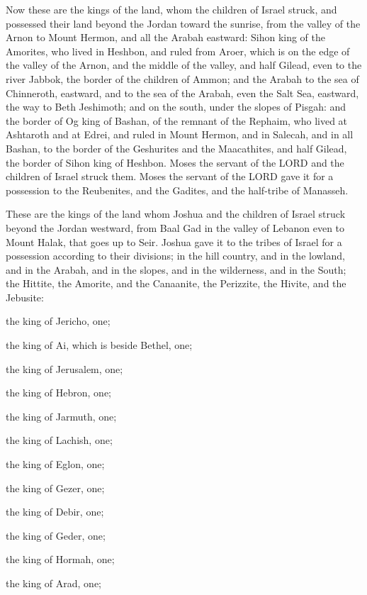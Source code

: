 \mychapter{} \myverse*{}Now these are the kings of the land, whom the children of Israel
struck, and possessed their land beyond the Jordan toward the sunrise, from the valley of the Arnon to
Mount Hermon, and all the Arabah eastward:
\myverse{}Sihon king of the Amorites, who lived in Heshbon, and ruled from Aroer, which
is on the edge of the valley of the Arnon, and the middle of the valley, and half Gilead, even to the
river Jabbok, the border of the children of Ammon;
\myverse{}and the Arabah to the sea of Chinneroth, eastward, and to the sea of the Arabah,
even the Salt Sea, eastward, the way to Beth Jeshimoth; and on the south, under the slopes of Pisgah:
\myverse{}and the border of Og king of Bashan, of the remnant of the Rephaim, who lived
at Ashtaroth and at Edrei,
\myverse{}and ruled in Mount Hermon, and in Salecah, and in all Bashan, to the border
of the Geshurites and the Maacathites, and half Gilead, the border of Sihon king of Heshbon.
\myverse{}Moses the servant of the LORD and the children of Israel struck them. Moses
the servant of the LORD gave it for a possession to the Reubenites, and the Gadites, and the half-tribe
of Manasseh.

\myverse{}These are the kings of the land whom Joshua and the children of
Israel struck beyond the Jordan westward, from Baal Gad in the valley of Lebanon even to Mount Halak,
that goes up to Seir. Joshua gave it to the tribes of Israel for a possession according to their divisions;
\myverse{}in the hill country, and in the lowland, and in the Arabah, and in the slopes,
and in the wilderness, and in the South; the Hittite, the Amorite, and the Canaanite, the Perizzite, the
Hivite, and the Jebusite:

\myverse{}the king of Jericho, one;

the king of Ai, which is beside Bethel, one;

\myverse{}the king of Jerusalem, one;

the king of Hebron, one;

\myverse{}the king of Jarmuth, one;

the king of Lachish, one;

\myverse{}the king of Eglon, one;

the king of Gezer, one;

\myverse{}the king of Debir, one;

the king of Geder, one;

\myverse{}the king of Hormah, one;

the king of Arad, one;

